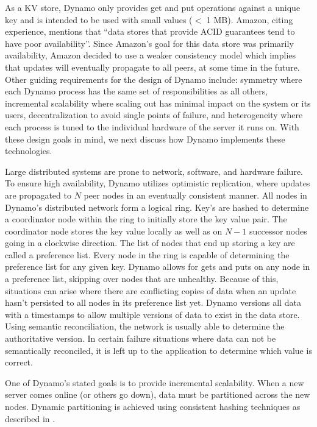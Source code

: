 \documentclass[]{article}
\begin{document}
As a KV store, Dynamo only provides get and put operations against a unique key and is intended to be used with small values ($<$ 1 MB). Amazon, citing experience, mentions that ``data stores that provide ACID guarantees tend to have poor availability''. Since Amazon's goal for this data store was primarily availability, Amazon decided to use a weaker consistency model which implies that updates will eventually propagate to all peers, at some time in the future. Other guiding requirements for the design of Dynamo include: symmetry where each Dynamo process has the same set of responsibilities as all others, incremental scalability where scaling out has minimal impact on the system or its users, decentralization to avoid single points of failure, and heterogeneity where each process is tuned to the individual hardware of the server it runs on. With these design goals in mind, we next discuss how Dynamo implements these technologies.

Large distributed systems are prone to network, software, and hardware failure. To ensure high availability, Dynamo utilizes optimistic replication, where updates are propagated to $N$ peer nodes in an eventually consistent manner. All nodes in Dynamo's distributed network form a logical ring. Key's are hashed to determine a coordinator node within the ring to initially store the key value pair. The coordinator node stores the key value locally as well as on $N-1$ successor nodes going in a clockwise direction. The list of nodes that end up storing a key are called a preference list. Every node in the ring is capable of determining the preference list for any given key. Dynamo allows for gets and puts on any node in a preference list, skipping over nodes that are unhealthy. Because of this, situations can arise where there are conflicting copies of data when an update hasn't persisted to all nodes in its preference list yet. Dynamo versions all data with a timestamps to allow multiple versions of data to exist in the data store. Using semantic reconciliation, the network is usually able to determine the authoritative version. In certain failure situations where data can not be semantically reconciled, it is left up to the application to determine which value is correct.  

One of Dynamo's stated goals is to provide incremental scalability. When a new server comes online (or others go down), data must be partitioned across the new nodes. Dynamic partitioning is achieved using consistent hashing techniques as described in \cite{karger_consistent_1997}.
\end{document}
